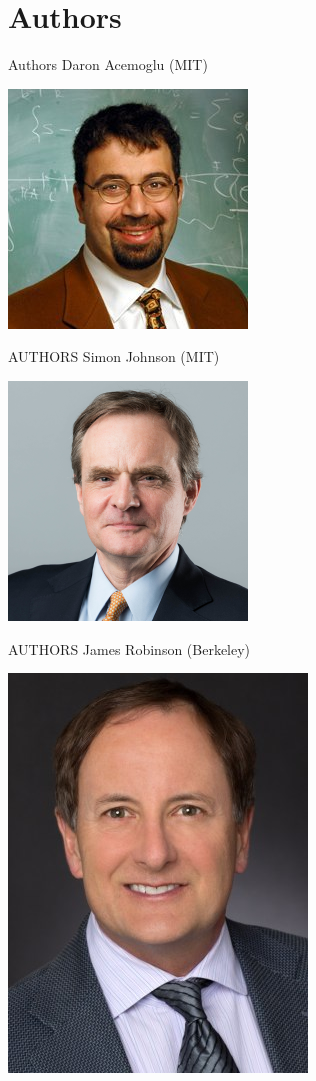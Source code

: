 \documentclass[pdftex,12pt,xcolor=pdftex,table]{beamer}
\theoremstyle{definition}
\theoremstyle{remark}
\numberwithin{equation}{section}
\numberwithin{figure}{section}
\begin{document}
	\section{Authors}
		\begin{frame}{Authors}
			\justifying
			\centering
			Daron Acemoglu (MIT)
			
			\includegraphics[scale=0.6]{pp1.jpg}
		\end{frame}
		\begin{frame}{AUTHORS}
			\justifying
			\centering
			Simon Johnson (MIT)
			
			\includegraphics[scale=0.6]{pp2.png}
		\end{frame}
		\begin{frame}{AUTHORS}
			\justifying
			\centering
			James Robinson (Berkeley)
			
			\includegraphics[scale=0.4]{pp3.jpg}
		\end{frame}
		
\end{document}
